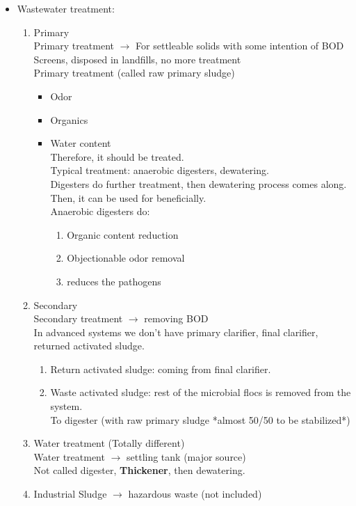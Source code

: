 \documentclass[12pt]{article}
\begin{document}
\begin{itemize}
    \item Wastewater treatment:\begin{enumerate}
        \item Primary\\
        Primary treatment $\rightarrow$ For settleable solids with some intention of BOD\\
        Screens, disposed in landfills, no more treatment\\
        Primary treatment (called raw primary sludge)\begin{itemize}
            \item Odor
            \item Organics
            \item Water content\\
            Therefore, it should be treated.\\
            Typical treatment: anaerobic digesters, dewatering.\\
            Digesters do further treatment, then dewatering process comes along.\\
            Then, it can be used for beneficially.\\
            Anaerobic digesters do:\begin{enumerate}
                \item Organic content reduction
                \item Objectionable odor removal
                \item reduces the pathogens
            \end{enumerate}
        \end{itemize}
        \item Secondary\\
        Secondary treatment $\rightarrow$ removing BOD\\
        In advanced systems we don't have primary clarifier, final clarifier, returned activated sludge.\begin{enumerate}
            \item Return activated sludge: coming from final clarifier.
            \item Waste activated sludge: rest of the microbial flocs is removed from the system.\\
            To digester (with raw primary sludge *almost 50/50 to be stabilized*)
        \end{enumerate}
    \item Water treatment (Totally different)\\
    Water treatment $\rightarrow$ settling tank (major source)\\
    Not called digester, \textbf{Thickener}, then dewatering.
    \item Industrial Sludge $\rightarrow$ hazardous waste (not included)
    \end{enumerate}
\end{itemize}
\end{document}

